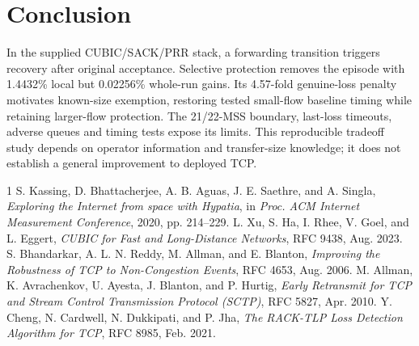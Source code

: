 \documentclass[conference]{IEEEtran}
\begin{document}
\section{Conclusion}
In the supplied CUBIC/SACK/PRR stack, a forwarding transition triggers
recovery after original acceptance. Selective protection removes the
episode with 1.4432\% local but 0.02256\% whole-run gains.
Its 4.57-fold genuine-loss penalty motivates known-size exemption,
restoring tested small-flow baseline timing while retaining larger-flow
protection. The 21/22-MSS boundary, last-loss timeouts, adverse queues
and timing tests expose its limits. This reproducible tradeoff study
depends on operator information and transfer-size knowledge; it does
not establish a general improvement to deployed TCP.

\begin{thebibliography}{1}
S. Kassing, D. Bhattacherjee, A. B. Aguas, J. E. Saethre, and A. Singla,
\emph{Exploring the Internet from space with Hypatia}, in
\emph{Proc. ACM Internet Measurement Conference}, 2020, pp. 214--229.
L. Xu, S. Ha, I. Rhee, V. Goel, and L. Eggert,
\emph{CUBIC for Fast and Long-Distance Networks}, RFC 9438, Aug. 2023.
S. Bhandarkar, A. L. N. Reddy, M. Allman, and E. Blanton,
\emph{Improving the Robustness of TCP to Non-Congestion Events},
RFC 4653, Aug. 2006.
M. Allman, K. Avrachenkov, U. Ayesta, J. Blanton, and P. Hurtig,
\emph{Early Retransmit for TCP and Stream Control Transmission Protocol
(SCTP)}, RFC 5827, Apr. 2010.
Y. Cheng, N. Cardwell, N. Dukkipati, and P. Jha,
\emph{The RACK-TLP Loss Detection Algorithm for TCP},
RFC 8985, Feb. 2021.
\end{thebibliography}
\end{document}

